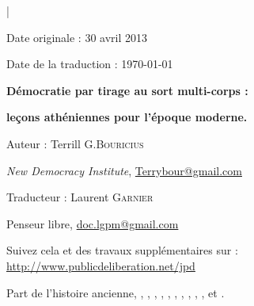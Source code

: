 \begin{titlepage}
    {\large{}}\par
  \hrulefill\par
  | \par
  \hrulefill\par
  Date originale : 30 avril 2013\par
  Date de la traduction : \today{}\par
  \vspace{0.25cm}
  \begin{Large}
      \textbf{Démocratie par tirage au sort multi-corps :} \par
      \textbf{leçons athéniennes pour l'époque moderne.}\par 
  \end{Large}
  \vspace{0.3cm}
  Auteur : Terrill G.\textsc{Bouricius}\par
    \emph{New Democracy Institute}, \url{Terrybour@gmail.com}\par
  Traducteur : Laurent \textsc{Garnier}\par
  Penseur libre, \url{doc.lgpm@gmail.com}\par
  \noindent
  \begin{small}
    Suivez cela et des travaux supplémentaires sur :
    \url{http://www.publicdeliberation.net/jpd} \par
    \noindent
    Part de l'histoire ancienne, ,  ,
    ,
    , 
    , , , , ,
    , et .\par 
  \end{small}
  \hrulefill\par
  \noindent
  \begin{recomd}
      \begin{footnotesize}

\end{footnotesize}
\end{recomd}
\end{titlepage}
